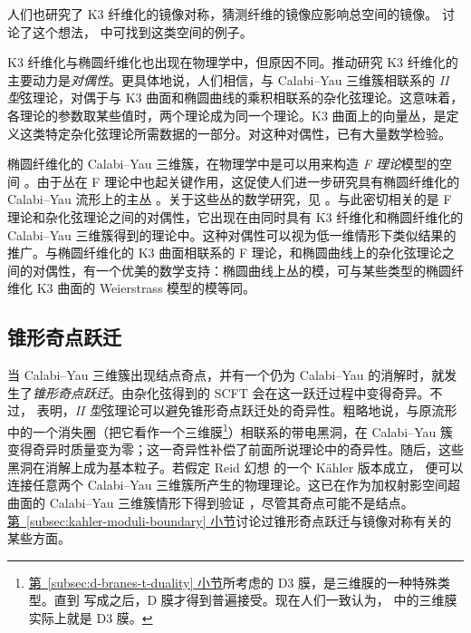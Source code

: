 人们也研究了 K3 纤维化的镜像对称，猜测纤维的镜像应影响总空间的镜像。 讨论了这个想法， 中可找到这类空间的例子。

K3 纤维化与椭圆纤维化也出现在物理学中，但原因不同。推动研究 K3 纤维化的主要动力是\emph{对偶性}。更具体地说，人们相信，与 Calabi--Yau 三维簇相联系的 \emph{II 型}弦理论，对偶于与 K3 曲面和椭圆曲线的乘积相联系的杂化弦理论。这意味着，各理论的参数取某些值时，两个理论成为同一个理论。K3 曲面上的向量丛，是定义这类特定杂化弦理论所需数据的一部分。对这种对偶性，已有大量数学检验。

椭圆纤维化的 Calabi--Yau 三维簇，在物理学中是可以用来构造 \emph{F 理论}模型的空间 。由于丛在 F 理论中也起关键作用，这促使人们进一步研究具有椭圆纤维化的 Calabi--Yau 流形上的主丛 。关于这些丛的数学研究，见 。与此密切相关的是 F 理论和杂化弦理论之间的对偶性，它出现在由同时具有 K3 纤维化和椭圆纤维化的 Calabi--Yau 三维簇得到的理论中。这种对偶性可以视为低一维情形下类似结果的推广。与椭圆纤维化的 K3 曲面相联系的 F 理论，和椭圆曲线上的杂化弦理论之间的对偶性，有一个优美的数学支持：椭圆曲线上丛的模，可与某些类型的椭圆纤维化 K3 曲面的 Weierstrass 模型的模等同。

\subsection{锥形奇点跃迁}\label{subsec:conifold-transitions-conclusion}
当 Calabi--Yau 三维簇出现结点奇点，并有一个仍为 Calabi--Yau 的消解时，就发生了\emph{锥形奇点跃迁}。由杂化弦得到的 SCFT 会在这一跃迁过程中变得奇异。不过， 表明，\emph{II 型}弦理论可以避免锥形奇点跃迁处的奇异性。粗略地说，与原流形中的一个消失圈（把它看作一个三维膜\footnote{\hyperref[subsec:d-branes-t-duality]{第~\ref*{subsec:d-branes-t-duality} 小节}所考虑的 D3 膜，是三维膜的一种特殊类型。直到  写成之后，D 膜才得到普遍接受。现在人们一致认为， 中的三维膜实际上就是 D3 膜。}）相联系的带电黑洞，在 Calabi--Yau 簇变得奇异时质量变为零；这一奇异性补偿了前面所说理论中的奇异性。随后，这些黑洞在消解上成为基本粒子。若假定 Reid 幻想  的一个 Kähler 版本成立，
便可以连接任意两个 Calabi--Yau 三维簇所产生的物理理论。这已在作为加权射影空间超曲面的 Calabi--Yau 三维簇情形下得到验证 ，尽管其奇点可能不是结点。\hyperref[subsec:kahler-moduli-boundary]{第~\ref*{subsec:kahler-moduli-boundary} 小节}讨论过锥形奇点跃迁与镜像对称有关的某些方面。

